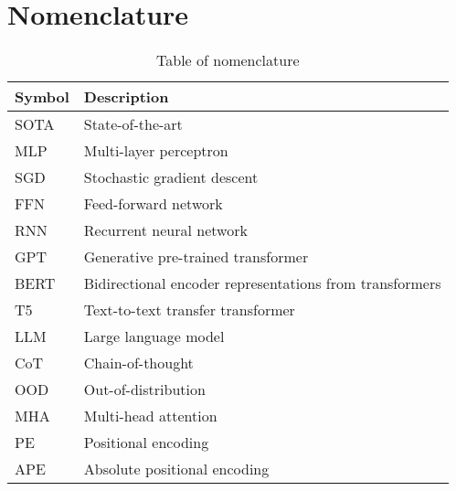 \chapter{Nomenclature}\label{app:nomenclature}

\begin{table}[H]
    \centering
    \begin{tabular}{ll}
        \toprule
        \textbf{Symbol} & \textbf{Description}                                    \\
        \midrule
        SOTA            & State-of-the-art                                        \\
        MLP             & Multi-layer perceptron                                  \\
        SGD             & Stochastic gradient descent                             \\
        FFN             & Feed-forward network                                    \\
        RNN             & Recurrent neural network                                \\
        GPT             & Generative pre-trained transformer                      \\
        BERT            & Bidirectional encoder representations from transformers \\
        T5              & Text-to-text transfer transformer                       \\
        LLM             & Large language model                                    \\
        CoT             & Chain-of-thought                                        \\
        OOD             & Out-of-distribution                                     \\
        MHA             & Multi-head attention                                    \\
        PE              & Positional encoding                                     \\
        APE             & Absolute positional encoding                            \\
        \bottomrule
    \end{tabular}
    \caption{Table of nomenclature}
    \label{tab:nomenclature}
\end{table}